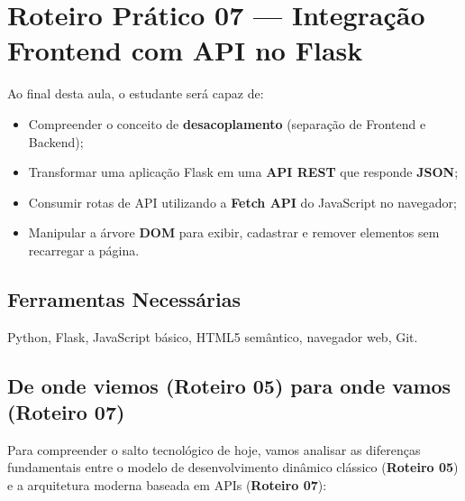 \documentclass[12pt,a4paper]{article}
\begin{document}
\section*{Roteiro Prático 07 — Integração Frontend com API no Flask}

\begin{boxAtividade}
Ao final desta aula, o estudante será capaz de:
\begin{itemize}
    \item Compreender o conceito de \textbf{desacoplamento} (separação de Frontend e Backend);
    \item Transformar uma aplicação Flask em uma \textbf{API REST} que responde \textbf{JSON};
    \item Consumir rotas de API utilizando a \textbf{Fetch API} do JavaScript no navegador;
    \item Manipular a árvore \textbf{DOM} para exibir, cadastrar e remover elementos sem recarregar a página.
\end{itemize}
\end{boxAtividade}

\subsection*{Ferramentas Necessárias}

Python, Flask, JavaScript básico, HTML5 semântico, navegador web, Git.

\subsection*{De onde viemos (Roteiro 05) para onde vamos (Roteiro 07)}

Para compreender o salto tecnológico de hoje, vamos analisar as diferenças fundamentais entre o modelo de desenvolvimento dinâmico clássico (\textbf{Roteiro 05}) e a arquitetura moderna baseada em APIs (\textbf{Roteiro 07}):
\end{document}
